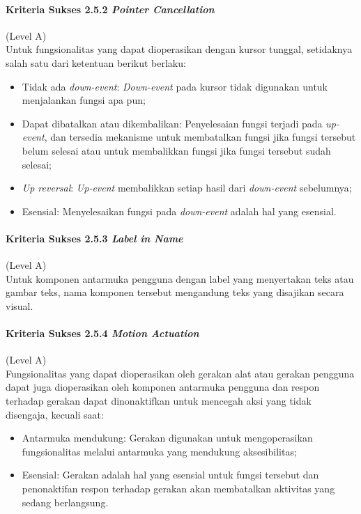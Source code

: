 \documentclass[a4paper,twoside]{article}
\begin{document}
\begin{enumerate}
		\paragraph{Kriteria Sukses 2.5.2 \textit{Pointer Cancellation}}
		\label{sec:kriteria_sukses_2.5.2}
		(Level A)\\

		Untuk fungsionalitas yang dapat dioperasikan dengan kursor tunggal, setidaknya salah satu dari ketentuan berikut berlaku:
		\begin{itemize}
			\item Tidak ada \textit{down-event}: \textit{Down-event} pada kursor tidak digunakan untuk menjalankan fungsi apa pun;
			\item Dapat dibatalkan atau dikembalikan: Penyelesaian fungsi terjadi pada \textit{up-event}, dan tersedia mekanisme untuk membatalkan fungsi jika fungsi tersebut belum selesai atau untuk membalikkan fungsi jika fungsi tersebut sudah selesai;
			\item \textit{Up reversal}: \textit{Up-event} membalikkan setiap hasil dari \textit{down-event} sebelumnya;
			\item Esensial: Menyelesaikan fungsi pada \textit{down-event} adalah hal yang esensial.
		\end{itemize}

		\paragraph{Kriteria Sukses 2.5.3 \textit{Label in Name}}
		\label{sec:kriteria_sukses_2.5.3}
		(Level A)\\

		Untuk komponen antarmuka pengguna dengan label yang menyertakan teks atau gambar teks, nama komponen tersebut mengandung teks yang disajikan secara visual. 

		\paragraph{Kriteria Sukses 2.5.4 \textit{Motion Actuation}}
		\label{sec:kriteria_sukses_2.5.4}
		(Level A)\\

		Fungsionalitas yang dapat dioperasikan oleh gerakan alat atau gerakan pengguna dapat juga dioperasikan oleh komponen antarmuka pengguna dan respon terhadap gerakan dapat dinonaktifkan untuk mencegah aksi yang tidak disengaja, kecuali saat:
		\begin{itemize}
			\item Antarmuka mendukung: Gerakan digunakan untuk mengoperasikan fungsionalitas melalui antarmuka yang mendukung aksesibilitas;
			\item Esensial: Gerakan adalah hal yang esensial untuk fungsi tersebut dan penonaktifan respon terhadap gerakan akan membatalkan aktivitas yang sedang berlangsung.
		\end{itemize}


\end{enumerate}
\end{document}
